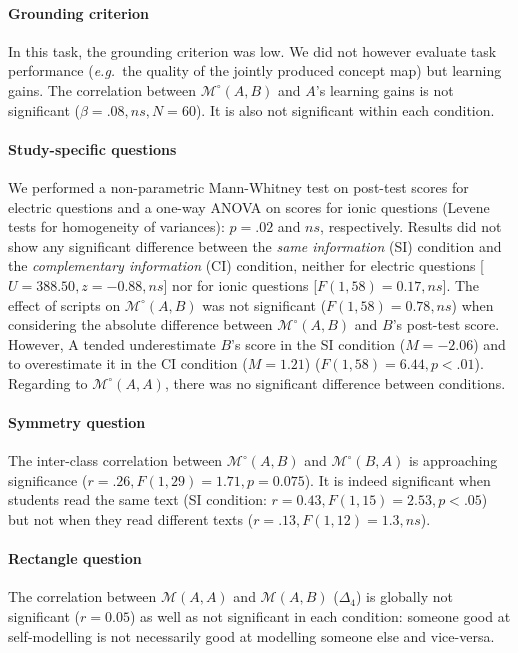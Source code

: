 \documentclass[natbib]{svjour3}
\newcommand{\eg}{{\textit{e.g.\ }}}
\newcommand{\gmodel}[2]{{$\mathcal{M}(#1, #2)$}}
\newcommand{\gModel}[2]{{$\mathcal{M}^{\circ}(#1, #2)$}}
\begin{document}
\paragraph{Grounding criterion} In this task, the grounding criterion was low.
We did not however evaluate task performance (\eg the quality of the jointly
produced concept map) but learning gains. The correlation between \gModel{A}{B}
and $A$'s learning gains is not significant ($\beta =.08, ns, N = 60$). It is
also not significant within each condition.

\paragraph{Study-specific questions} We performed a non-parametric Mann-Whitney
test on post-test scores for electric questions and a one-way ANOVA on scores
for ionic questions (Levene tests for homogeneity of variances): $p = .02$ and
$ns$, respectively. Results  did not show any significant difference between the
\emph{same information} (SI) condition and the \emph{complementary information}
(CI) condition, neither for electric questions [$U = 388.50, z = -0.88, ns$] nor
for ionic questions [$F(1, 58) = 0.17, ns$].  The effect of scripts on
\gModel{A}{B} was not significant ($F(1, 58) = 0.78, ns$) when considering the
absolute difference between \gModel{A}{B} and $B$'s post-test score. However, A
tended underestimate $B$'s score in the SI condition ($M = -2.06$) and to
overestimate it in the CI condition ($M = 1.21$) ($F(1, 58) = 6.44, p<.01$).
Regarding to \gModel{A}{A}, there was no significant difference between
conditions.

\paragraph{Symmetry question} The inter-class correlation between \gModel{A}{B}
and \gModel{B}{A} is approaching significance ($r=.26, F(1,29)=1.71, p=
0.075$). It is indeed significant when students read the same text (SI
condition: $r=0.43, F(1,15)=2.53, p<.05$) but not when they read different texts
($r=.13, F(1,12)=1.3, ns$). 

\paragraph{Rectangle question} The correlation between \gmodel{A}{A}
and \gmodel{A}{B} ($\Delta_4$) is globally not significant ($r=0.05$) as well as not
significant in each condition: someone good at self-modelling is not necessarily
good at modelling someone else and vice-versa.
\end{document}
